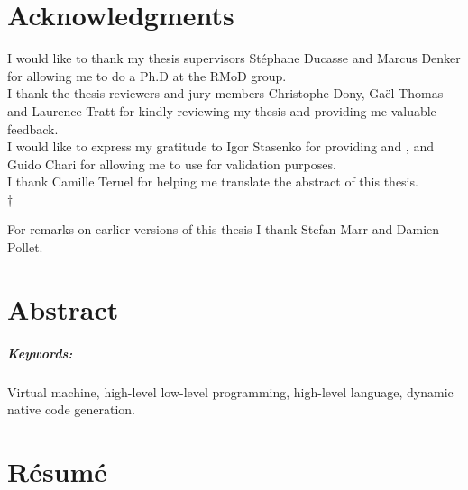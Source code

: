 \documentclass[a4paper,11pt,twoside]{include/ThesisStyle}
\begin{document}


\dominitoc

\cleardoublepage
\chapter*{Acknowledgments}

I would like to thank my thesis supervisors Stéphane Ducasse and Marcus Denker for allowing me to do a Ph.D at the RMoD group.\\

\noindent I thank the thesis reviewers and jury members Christophe Dony, Gaël Thomas and Laurence Tratt for kindly reviewing my thesis and providing me valuable feedback.\\

\noindent I would like to express my gratitude to Igor Stasenko for providing \B and \NB, and Guido Chari for allowing me to use \WF for validation purposes.\\

\noindent I thank Camille Teruel for helping me translate the abstract of this thesis. \\†

\noindent For remarks on earlier versions of this thesis I thank Stefan Marr and Damien Pollet.



\chapter*{Abstract}

\paragraph{Keywords:} Virtual machine, high-level low-level programming, high-level language, dynamic native code generation.

\chapter*{Résumé}
 
\end{document}
